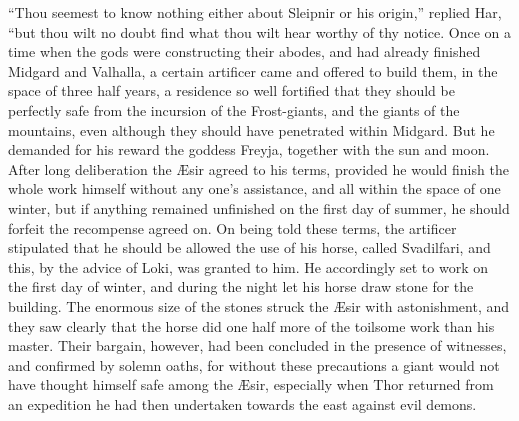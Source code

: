 ``Thou seemest to know nothing either about Sleipnir or his origin,''
replied Har, ``but thou wilt no doubt find what thou wilt hear worthy
of thy notice. Once on a time when the gods were constructing their
abodes, and had already finished Midgard and Valhalla, a certain
artificer came and offered to build them, in the space of three half
years, a residence so well fortified that they should be perfectly
safe from the incursion of the Frost-giants, and the giants of the
mountains, even although they should have penetrated within Midgard.
But he demanded for his reward the goddess Freyja, together with the
sun and moon. After long deliberation the Æsir agreed to his terms,
provided he would finish the whole work himself without any one's
assistance, and all within the space of one winter, but if anything
remained unfinished on the first day of summer, he should forfeit the
recompense agreed on. On being told these terms, the artificer
stipulated that he should be allowed the use of his horse, called
Svadilfari, and this, by the advice of Loki, was granted to him. He
accordingly set to work on the first day of winter, and during the
night let his horse draw stone for the building. The enormous size of
the stones struck the Æsir with astonishment, and they saw clearly
that the horse did one half more of the toilsome work than his master.
Their bargain, however, had been concluded in the presence of
witnesses, and confirmed by solemn oaths, for without these
precautions a giant would not have thought himself safe among the
Æsir, especially when Thor returned from an expedition he had then
undertaken towards the east against evil demons.

